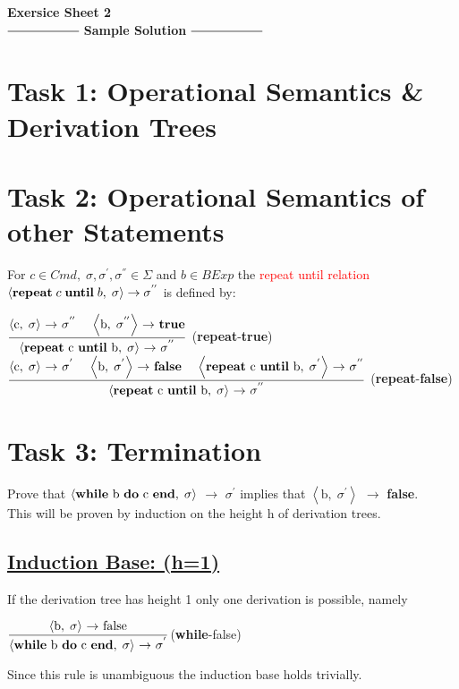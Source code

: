 \documentclass[12pt,a4paper]{article}
\newcommand{\eRelation}[2]{$\dfrac{\text{#1}}{\text{#2}}$}
\newcommand{\eState}[2]{$\left\langle \text{#1},\; \text{#2}\right\rangle$}
\newcommand{\eRule}[3]{\eState{#1}{#2} $\rightarrow$ #3}
\begin{document}
	\begin{center}
		\huge\textbf{Exersice Sheet 2}\\[0.5cm]
	
		\Large
		$\mathrel{\vcenter{\hbox{\rule{2cm}{0.5pt}}}}$ \textbf{Sample 				Solution} $\mathrel{\vcenter{\hbox{\rule{2cm}{0.5pt}}}}$\\[1cm]
	\end{center}
\large
	\section*{Task 1: Operational Semantics \& Derivation Trees}
	\section*{Task 2: Operational Semantics of other Statements}
		\indent\indent For $c\in Cmd,\; \sigma , \sigma ^{'}, \sigma ^{''} \in \Sigma$ and $b\in BExp$ the \textcolor{red}{repeat until relation}\\\indent $\left< \text{\textbf{repeat}}\; c\; \text{\textbf{until}}\; b,\; \sigma \right> \rightarrow \sigma ^{''}$ is defined by:\\
		
		\begin{center}
			\eRelation
				{\eRule{c}{$\sigma$}{$\sigma ^{''}$ \quad \eRule{b}{$\sigma ^{''}$}{\textbf{true}}}}
				{\eRule{\textbf{repeat} c \textbf{until} b}{$\sigma$}{$\sigma ^{''}$}}
			(\textbf{repeat}-\textbf{true})\\[0.75cm]
			\eRelation
				{\eRule{c}{$\sigma$}{$\sigma ^{'}$} \quad \eRule{b}{$\sigma ^{'}$}{\textbf{false}} \quad \eRule{\textbf{repeat} c \textbf{until} b}{$\sigma ^{'}$}{$\sigma ^{''}$}}
				{\eRule{\textbf{repeat} c \textbf{until} b}{$\sigma$}{$\sigma ^{''}$}}
			(\textbf{repeat}-\textbf{false})\\
		\end{center}
	\section*{Task 3: Termination}
		\indent\indent Prove that \eRule{\textbf{while} b \textbf{do} c \textbf{end}}{$\sigma$}{$\sigma ^{'}$} implies that \eRule{b}{$\sigma ^{'}$}{\textbf{false}}.\\
		\indent This will be proven by induction on the height h of derivation trees.\\
		\subsection*{\underline{Induction Base: (h=1)}}
		\indent\indent If the derivation tree has height 1 only one derivation is possible, namely\\
		\begin{center}
			\eRelation
				{\eRule{b}{$\sigma$}{false}}
				{\eRule{\textbf{while} b \textbf{do} c \textbf{end}}{$\sigma$}{$\sigma ^{'}$}}(\textbf{while}-false)
		\end{center}
		\indent\indent Since this rule is unambiguous the induction base holds trivially.\\
\end{document}
